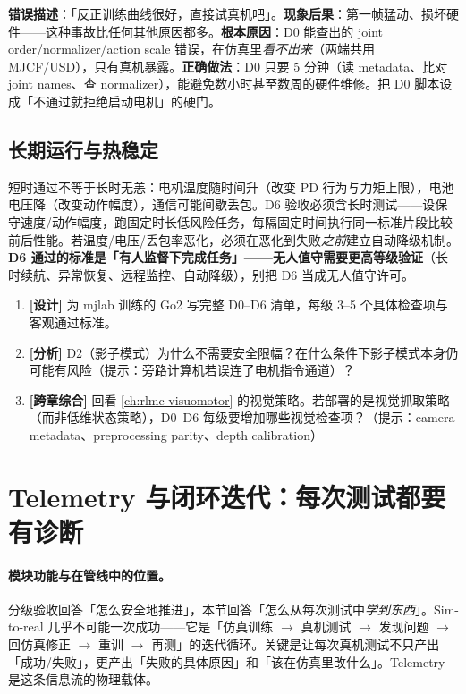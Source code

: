 \begin{pitfall}[跳过 D0 直接上真机]
\textbf{错误描述}：「反正训练曲线很好，直接试真机吧」。\textbf{现象后果}：第一帧猛动、损坏硬件——这种事故比任何其他原因都多。\textbf{根本原因}：D0 能查出的 joint order/normalizer/action scale 错误，在仿真里\emph{看不出来}（两端共用 MJCF/USD），只有真机暴露。\textbf{正确做法}：D0 只要 5 分钟（读 metadata、比对 joint names、查 normalizer），能避免数小时甚至数周的硬件维修。把 D0 脚本设成「不通过就拒绝启动电机」的硬门。
\end{pitfall}

\subsection{长期运行与热稳定}
\label{sec:rlmc-s2r-thermal}

短时通过不等于长时无恙：电机温度随时间升（改变 PD 行为与力矩上限），电池电压降（改变动作幅度），通信可能间歇丢包。D6 验收必须含长时测试——设保守速度/动作幅度，跑固定时长低风险任务，每隔固定时间执行同一标准片段比较前后性能。若温度/电压/丢包率恶化，必须在恶化到失败\emph{之前}建立自动降级机制。\textbf{D6 通过的标准是「有人监督下完成任务」——无人值守需要更高等级验证}（长时续航、异常恢复、远程监控、自动降级），别把 D6 当成无人值守许可。

\begin{practice}[分级验收动手]
\begin{enumerate}
  \item \textbf{[设计]} 为 mjlab 训练的 Go2 写完整 D0--D6 清单，每级 3--5 个具体检查项与客观通过标准。
  \item \textbf{[分析]} D2（影子模式）为什么不需要安全限幅？在什么条件下影子模式本身仍可能有风险（提示：旁路计算机若误连了电机指令通道）？
  \item \textbf{[跨章综合]} 回看 \cref{ch:rlmc-visuomotor} 的视觉策略。若部署的是视觉抓取策略（而非低维状态策略），D0--D6 每级要增加哪些视觉检查项？（提示：camera metadata、preprocessing parity、depth calibration）
\end{enumerate}
\end{practice}

\section{Telemetry 与闭环迭代：每次测试都要有诊断}
\label{sec:rlmc-s2r-telemetry}

\paragraph{模块功能与在管线中的位置。}分级验收回答「怎么安全地推进」，本节回答「怎么从每次测试中\emph{学到东西}」。Sim-to-real 几乎不可能一次成功——它是「仿真训练 $\to$ 真机测试 $\to$ 发现问题 $\to$ 回仿真修正 $\to$ 重训 $\to$ 再测」的迭代循环。关键是让每次真机测试不只产出「成功/失败」，更产出「失败的具体原因」和「该在仿真里改什么」。Telemetry 是这条信息流的物理载体。

